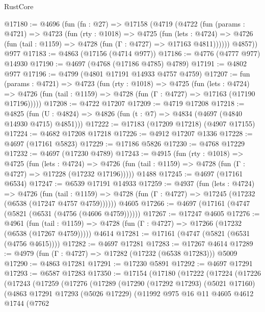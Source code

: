 \begin{lexlean}{RustCore}
\begin{coremodule}
@17180 := @4696
    (fun (fn : @27) =>
    @17158
      (@4719
        (@4722
          (fun (params : @4721) =>
          @4723
            (fun (rty : @1018) =>
            @4725
              (fun (lets : @4724) =>
              @4726 (fun (tail : @1159) => @4728 (fun (Γ : @4727) => @17163 @4811))))))
        @4857))
    @977
@17183 := @4863 (@17156 (@4714 @977))
@17186 := @4776 (@4777 @977) @14930
@17190 := @4697 (@4768 (@17186 @4785) @4789)
@17191 := @4802 @977
@17196 := @4799 (@4801 @17191 @14933 @4757 @4759)
@17207 := fun (params : @4721) =>
  @4723
    (fun (rty : @1018) =>
    @4725
      (fun (lets : @4724) =>
      @4726 (fun (tail : @1159) => @4728 (fun (Γ : @4727) => @17163 (@17190 @17196)))))
@17208 := @4722 @17207
@17209 := @4719 @17208
@17218 := @4825
    (fun (U : @4824) => @4826 (fun (t : @7) => @4834 (@4697 (@4840 @14930 @4715) @4851)))
@17222 := @17183 (@17209 @17218) (@4907 @17155)
@17224 := @4682 @17208 @17218
@17226 := @4912 @17207 @1336
@17228 := @4697 (@17161 @5823)
@17229 := @17186 @5826
@17230 := @4768 @17229
@17232 := @4697 (@17230 @4789)
@17243 := @4915
    (fun (rty : @1018) =>
    @4725
      (fun (lets : @4724) =>
      @4726 (fun (tail : @1159) => @4728 (fun (Γ : @4727) => @17228 (@17232 @17196)))))
    @1488
@17245 := @4697 (@17161 @6534)
@17247 := @6539 @17191 @14933
@17259 := @4937
    (fun (lets : @4724) =>
    @4726
      (fun (tail : @1159) =>
      @4728 (fun (Γ : @4727) => @17245 (@17232 (@6538 (@17247 @4757 @4759))))))
    @4605
@17266 := @4697 (@17161 (@4747 (@5821 (@6531 (@4756 (@4606 @4759))))))
@17267 := @17247 @4605
@17276 := @4961
    (fun (tail : @1159) => @4728 (fun (Γ : @4727) => @17266 (@17232 (@6538 (@17267 @4759)))))
    @4614
@17281 := @17161 (@4747 (@5821 (@6531 (@4756 @4615))))
@17282 := @4697 @17281
@17283 := @17267 @4614
@17289 := @4979 (fun (Γ : @4727) => @17282 (@17232 (@6538 @17283))) @5009
@17290 := @4863 @17281
@17291 := @17230 @5891
@17292 := @4697 @17291
@17293 := @6587 @17283
@17350 := @17154
    (@17180
      (@17222
        (@17224
          (@17226
            (@17243
              (@17259
                (@17276
                  (@17289
                    (@17290
                      (@17292 @17293)
                      (@5021 @17160)
                      (@4863
                        @17291
                        @17293
                        (@5026 @17229)
                        (@11992
                          @975
                          @16
                          @11
                          @4605
                          @4612
                          @1744
                          (@7762

\end{coremodule}
\end{lexlean}
